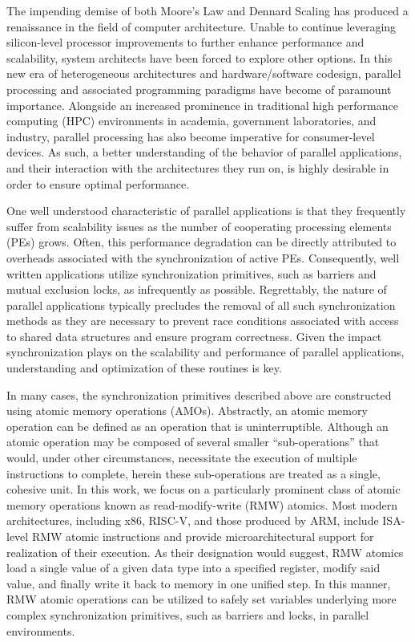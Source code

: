 
The impending demise of both Moore's Law and Dennard Scaling has produced a renaissance in the field of computer architecture.
Unable to continue leveraging silicon-level processor improvements to further enhance performance and scalability, system architects have been forced to explore other options.
In this new era of heterogeneous architectures and hardware/software codesign, parallel processing and associated programming paradigms have become of paramount importance.
Alongside an increased prominence in traditional high performance computing (HPC) environments in academia, government laboratories, and industry, parallel processing has also become imperative for consumer-level devices.
As such, a better understanding of the behavior of parallel applications, and their interaction with the architectures they run on, is highly desirable in order to ensure optimal performance.

One well understood characteristic of parallel applications is that they frequently suffer from scalability issues as the number of cooperating processing elements (PEs) grows.
Often, this performance degradation can be directly attributed to overheads associated with the synchronization of active PEs.
Consequently, well written applications utilize synchronization primitives, such as barriers and mutual exclusion locks, as infrequently as possible.
Regrettably, the nature of parallel applications typically precludes the removal of all such synchronization methods as they are necessary to prevent race conditions associated with access to shared data structures and ensure program correctness.
Given the impact synchronization plays on the scalability and performance of parallel applications, understanding and optimization of these routines is key.

In many cases, the synchronization primitives described above are constructed using atomic memory operations (AMOs).
Abstractly, an atomic memory operation can be defined as an operation that is uninterruptible.
Although an atomic operation may be composed of several smaller ``sub-operations'' that would, under other circumstances, necessitate the execution of multiple instructions to complete, herein these sub-operations are treated as a single, cohesive unit.
In this work, we focus on a particularly prominent class of atomic memory operations known as read-modify-write (RMW) atomics.
Most modern architectures, including x86, RISC-V, and those produced by ARM, include ISA-level RMW atomic instructions and provide microarchitectural support for realization of their execution.
As their designation would suggest, RMW atomics load a single value of a given data type into a specified register, modify said value, and finally write it back to memory in one unified step.
In this manner, RMW atomic operations can be utilized to safely set variables underlying more complex synchronization primitives, such as barriers and locks, in parallel environments.

